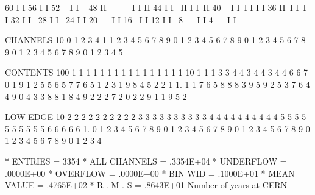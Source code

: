 \begin{Listing}
       60                                           I                                          I
       56                                           I                                          I
       52                           --              I                                          I  --
       48                           II--    --  ----I                                          I  II
       44                           I  I  --II  I                                              I--II
       40                       --  I  I--I  I  I                                                  I
       36                       II--I        I--I                                                  I
       32                       I                                                                  I--
       28                       I                                                                    I--
       24                       I                                                                      I
       20                   ----I                                                                      I
       16                 --I                                                                          I
       12                 I                                                                            I--
        8             ----I                                                                              I
        4         ----I                                                                                  I
 
 CHANNELS  10    0                 1                   2                   3                   4             
            1    1 2 3 4 5 6 7 8 9 0 1 2 3 4 5 6 7 8 9 0 1 2 3 4 5 6 7 8 9 0 1 2 3 4 5 6 7 8 9 0 1 2 3 4 5   
 
 CONTENTS 100                                              1 1   1 1 1 1 1 1 1 1 1 1 1 1 1 1              
           10              1 1 1 3 3 4 4 3 4 4 3 4 4 6 6 7 0 1 9 1 2 5 5 6 5 7 7 6 5 1 2 3 1 9 8 4 5 2 2 1
            1.     1 1 7 6 5 8 8 8 3 9 5 9 2 5 3 7 6 4 4 9 0 4 3 3 8 8 1 8 4 9 2 2 2 7 2 0 2 2 9 1 1 9 5 2
 
 LOW-EDGE  10   2 2 2 2 2 2 2 2 2 2 3 3 3 3 3 3 3 3 3 3 4 4 4 4 4 4 4 4 4 4 5 5 5 5 5 5 5 5 5 5 6 6 6 6 6 
            1.  0 1 2 3 4 5 6 7 8 9 0 1 2 3 4 5 6 7 8 9 0 1 2 3 4 5 6 7 8 9 0 1 2 3 4 5 6 7 8 9 0 1 2 3 4 
 
 * ENTRIES =       3354      * ALL CHANNELS =  .3354E+04      * UNDERFLOW =  .0000E+00      * OVERFLOW =  .0000E+00
 * BIN WID =  .1000E+01      * MEAN VALUE   =  .4765E+02      * R . M . S =  .8643E+01
\newpage
 Number of years at CERN                                                         
 

\end{Listing}
